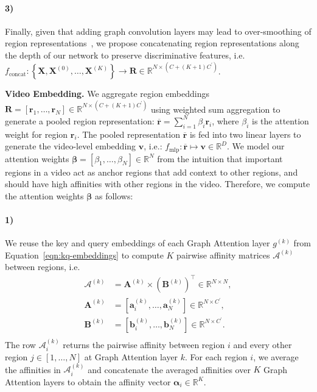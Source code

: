 \documentclass[letterpaper]{article} \usepackage{aaai22}  \usepackage{times}  \usepackage{helvet}  \usepackage{courier}  \usepackage[hyphens]{url}  \usepackage{graphicx} \urlstyle{rm} \usepackage{amsmath}
\begin{document}
\vspace{-2mm}
\paragraph{3)} Finally, given that adding graph convolution layers may lead to over-smoothing of region representations~\cite{gcn:over-smoothing1, chen2019measuring}, we propose concatenating region representations along the depth of our network to preserve discriminative features, i.e. $f_\text{concat}: \left\{\mathbf{X}, \mathbf{X}^{(0)}, \ldots, \mathbf{X}^{(K)}\right\} \rightarrow \mathbf{R} \in \mathbb{R}^{N \times \left(C + (K+1)C^\prime\right)}$.

\textbf{Video Embedding.} We aggregate region embeddings $\mathbf{R}=[\mathbf{r}_1, \ldots, \mathbf{r}_N] \in \mathbb{R}^{N \times \left(C + (K+1)C^\prime\right)}$ using weighted sum aggregation to generate a pooled region representation:
$\overline{\mathbf{r}}=\sum^{N}_{i=1}\beta_i \mathbf{r}_i$,
where $\beta_i$ is the attention weight for region $\mathbf{r}_i$. The pooled representation $\overline{\mathbf{r}}$ is fed into two linear layers to generate the video-level embedding $\mathbf{v}$, i.e.: $f_\text{mlp}:\overline{\mathbf{r}} \mapsto \mathbf{v} \in \mathbb{R}^D$. We model our attention weights $\boldsymbol{\beta} = [\beta_1, \ldots, \beta_N] \in \mathbb{R}^N$ from the intuition that important regions in a video act as anchor regions that add context to other regions, and should have high affinities with other regions in the video. Therefore, we compute the attention weights $\boldsymbol{\beta}$ as follows:
\vspace{-2mm}
\paragraph{1)} We reuse the key and query embeddings of each Graph Attention layer $g^{(k)}$ from Equation~\ref{eqn:kq-embeddings} to compute $K$ pairwise affinity matrices $\mathcal{A}^{(k)}$ between regions, i.e.
\begin{equation}
    \begin{aligned}
    \mathcal{A}^{(k)}&=\mathbf{A}^{(k)} \times \left(\mathbf{B}^{(k)}\right)^\top \in \mathbb{R}^{N \times N}, \\
    \mathbf{A}^{(k)} &= [\mathbf{a}_i^{(k)}, \ldots, \mathbf{a}^{(k)}_N] \in \mathbb{R}^{N \times C^\prime}, \\
    \mathbf{B}^{(k)} &= [\mathbf{b}_i^{(k)}, \ldots, \mathbf{b}^{(k)}_N] \in \mathbb{R}^{N \times C^\prime}. \\
    \end{aligned}
\end{equation}
The row $\mathcal{A}_i^{(k)}$ returns the pairwise affinity between region $i$ and every other region $j \in [1, \ldots, N]$ at Graph Attention layer $k$. For each region $i$, we average the affinities in $\mathcal{A}_i^{(k)}$ and concatenate the averaged affinities over $K$ Graph Attention layers to obtain the affinity vector $\boldsymbol{\alpha}_i \in \mathbb{R}^{K}$. 
\end{document}
